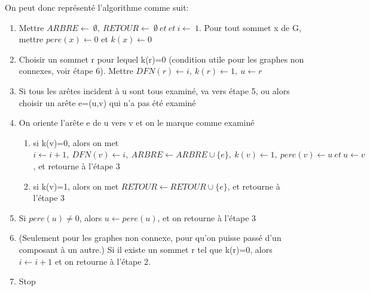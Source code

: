 On peut donc représenté l'algorithme comme suit:



%
%			
%			
%			
%
%
%

%
\begin{enumerate}
	\item Mettre  $ARBRE \leftarrow\ \emptyset,\ RETOUR \leftarrow\ \emptyset\ et\ et\ i\leftarrow\ 1$. Pour tout sommet x de G, mettre $pere(x)\leftarrow 0$ et $k(x)\leftarrow 0$
	\item Choisir un sommet r pour lequel k(r)=0 (condition utile pour les graphes non connexes, voir étape 6). Mettre  $DFN(r) \gets i,\ k(r) \gets 1,\ u \gets r$
	\item Si tous les arêtes incident à u sont tous examiné, va vers étape 5, ou alors choisir un arête e=(u,v) qui n'a pas été examiné
	\item On oriente l'arête e de u vers v et on le marque comme examiné
	\begin{enumerate}
		\item si k(v)=0, alors on met $i \gets i+1,\ DFN(v)\gets i,\ ARBRE\gets ARBRE \cup\{e\},\ k(v)\gets 1,\ pere(v)\gets u\ et\ u\gets v$, et retourne à l'étape 3
		\item si k(v)=1, alors on met $RETOUR\gets RETOUR\cup\{e\}$, et retourne à l'étape 3
	\end{enumerate}  
	\item Si $pere(u)\neq 0$, alors $u\gets pere(u)$, et on retourne à l'étape 3
	\item (Seulement pour les graphes non connexe, pour qu'on puisse passé d'un composant à un autre.) Si il existe un sommet r tel que k(r)=0, alors $i\gets i+1$ et on retourne à l'étape 2.
	\item Stop
\end{enumerate}



